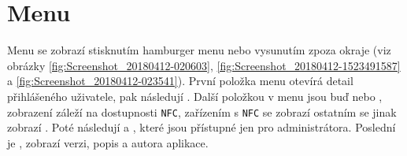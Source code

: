 \documentclass[12pt]{report}
\begin{document}
\section{Menu}
Menu se zobrazí stisknutím hamburger menu nebo vysunutím zpoza okraje (viz obrázky \ref{fig:Screenshot_20180412-020603}, \ref{fig:Screenshot_20180412-1523491587} a \ref{fig:Screenshot_20180412-023541}).
První položka menu otevírá detail přihlášeného uživatele, pak následují . 
Další položkou v menu jsou buď  nebo , zobrazení záleží na dostupnosti \texttt{NFC}, zařízením s \texttt{NFC} se zobrazí  ostatním se jinak zobrazí .
Poté následují  a , které jsou přístupné jen pro administrátora.
Poslední je , zobrazí verzi, popis a autora aplikace.
\end{document}
